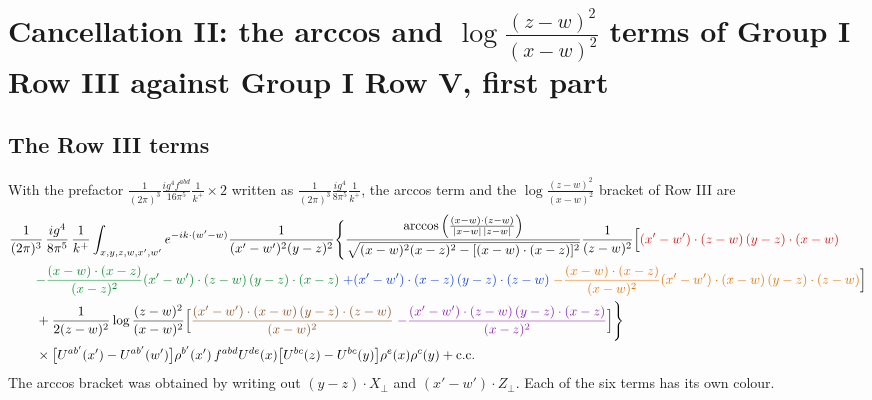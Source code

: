 \documentclass[10pt]{article}
\newcommand{\R}[1]{{\color{cR}#1}}
\newcommand{\B}[1]{{\color{cB}#1}}
\newcommand{\G}[1]{{\color{cG}#1}}
\newcommand{\Or}[1]{{\color{cO}#1}}
\newcommand{\Vi}[1]{{\color{cV}#1}}
\newcommand{\Br}[1]{{\color{cN}#1}}
\begin{document}
\section{Cancellation II: the arccos and $\log\frac{(z-w)^{2}}{(x-w)^{2}}$ terms of Group I Row III against Group I Row V, first part}

\subsection*{The Row III terms}
With the prefactor $\frac{1}{(2\pi)^{3}}\frac{ig^{4}f^{abd}}{16\pi^{5}}\frac{1}{k^{+}}\times2$ written as $\frac{1}{(2\pi)^{3}}\frac{ig^{4}}{8\pi^{5}}\frac{1}{k^{+}}$, the arccos term and the $\log\frac{(z-w)^{2}}{(x-w)^{2}}$ bracket of Row III are
\begin{align}
&\frac{1}{(2\pi)^{3}}\,\frac{ig^{4}}{8\pi^{5}}\,\frac{1}{k^{+}}\int_{x,y,z,w,x',w'}e^{-ik\cdot(w'-w)}\frac{1}{(x'-w')^{2}(y-z)^{2}}\Bigg\{\frac{\arccos\Big(\frac{(x-w)\cdot(z-w)}{|x-w|\,|z-w|}\Big)}{\sqrt{(x-w)^{2}(x-z)^{2}-[(x-w)\cdot(x-z)]^{2}}}\frac{1}{(z-w)^{2}}\Big[\R{(x'-w')\cdot(z-w)\,(y-z)\cdot(x-w)}\notag\\
&\qquad\G{-\frac{(x-w)\cdot(x-z)}{(x-z)^{2}}(x'-w')\cdot(z-w)\,(y-z)\cdot(x-z)}\;\B{+(x'-w')\cdot(x-z)\,(y-z)\cdot(z-w)}\;\Or{-\frac{(x-w)\cdot(x-z)}{(x-w)^{2}}(x'-w')\cdot(x-w)\,(y-z)\cdot(z-w)}\Big]\notag\\
&\qquad+\frac{1}{2(z-w)^{2}}\log\frac{(z-w)^{2}}{(x-w)^{2}}\Big[\Br{\frac{(x'-w')\cdot(x-w)\,(y-z)\cdot(z-w)}{(x-w)^{2}}}\;\Vi{-\frac{(x'-w')\cdot(z-w)\,(y-z)\cdot(x-z)}{(x-z)^{2}}}\Big]\Bigg\}\notag\\
&\qquad\times\big[U^{ab'}(x')-U^{ab'}(w')\big]\rho^{b'}(x')\,f^{abd}U^{de}(x)\big[U^{bc}(z)-U^{bc}(y)\big]\rho^{e}(x)\rho^{c}(y)+{\rm c.c.}
\end{align}
The arccos bracket was obtained by writing out $(y-z)\cdot X_{\perp}$ and $(x'-w')\cdot Z_{\perp}$. Each of the six terms has its own colour.
\end{document}
